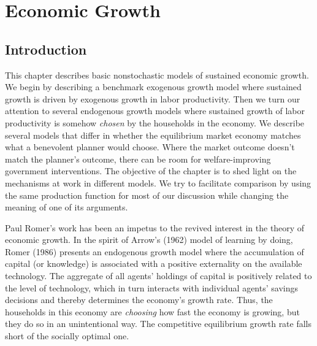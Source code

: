 

%


\showchaptIDtrue
\def\@chaptID{11.}



\def\toone{{t+1}}
\def\ttwo{{t+2}}
\def\tthree{{t+3}}
\def\Tone{{T+1}}
\def\TTT{{T-1}}
\def\rtr{{\rm tr}}
\chapter{Economic Growth\label{growth}}

\section{Introduction}

This chapter describes basic nonstochastic models of sustained
economic growth.   We begin by describing a
 benchmark exogenous  growth model where sustained growth
is driven by exogenous growth in labor productivity.
Then we turn our attention to several   endogenous growth
 models where sustained growth of labor   productivity
is somehow {\it chosen\/} by the households in the economy.
We describe several models that differ in whether the
equilibrium market economy matches what a benevolent planner
would choose.   Where the market outcome doesn't match
the planner's outcome, there can be room   for welfare-improving
government interventions. The objective of the chapter is to
shed light on the mechanisms at work in different models.
We try to facilitate comparison by using the same production
function for most of our discussion while changing the meaning
of one of its arguments.

Paul Romer's
%
work has been an impetus to the revived interest
in the theory of economic growth. In the spirit of Arrow's (1962)
%
model of learning by doing, Romer (1986) presents an endogenous
growth model where the accumulation of capital (or knowledge) is
associated with a positive externality on the available technology.
The aggregate of all agents' holdings of capital
is positively related to the level of technology, which
in turn interacts with individual agents' savings decisions
and thereby determines the economy's growth rate.
Thus, the households in this economy are {\it choosing\/} how
fast the economy is growing, but they do so in an unintentional way.
The competitive equilibrium growth rate falls short of the
socially optimal one.

